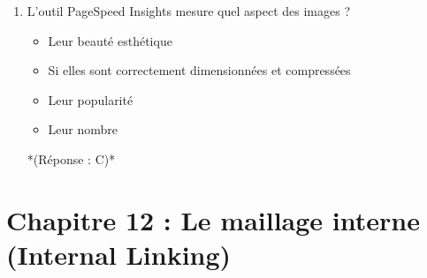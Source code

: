 \documentclass[12pt,a4paper,twoside]{report}
\begin{document}
\begin{enumerate}
\item L'outil PageSpeed Insights mesure quel aspect des images ?
\begin{itemize}
\item[A)] Leur beauté esthétique
\item[B)] Si elles sont correctement dimensionnées et compressées
\item[C)] Leur popularité
\item[D)] Leur nombre
\end{itemize}
*(Réponse : C)*
\end{enumerate}

\newpage

\section*{Chapitre 12 : Le maillage interne (Internal Linking)}
\end{document}
